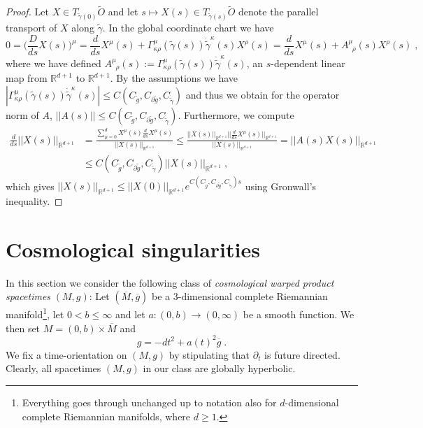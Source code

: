 \documentclass[reqno]{article}
\newcommand{\R}{\mathbb{R}}
\begin{document}
\begin{proof}
Let $X \in T_{\tilde{\gamma}(0)}\tilde{O}$ and let $s \mapsto X(s) \in T_{\tilde{\gamma}(s)} \tilde{O}$ denote the parallel transport of $X$ along $\tilde{\gamma}$. In the global coordinate chart we have $$ 0 = \Big(\frac{D}{ds} X(s)\Big)^\mu = \frac{d}{ds} X^\mu(s) + \Gamma^\mu_{\kappa \rho}(\tilde{\gamma}(s)) \dot{\tilde{\gamma}}^\kappa(s) X^\rho(s) = \frac{d}{ds} X^\mu(s) + A^\mu_{\;\; \rho}(s) X^\rho(s) \;,$$
where we have defined $A^\mu_{\;\; \rho}(s) :=   \Gamma^\mu_{\kappa \rho}(\tilde{\gamma}(s)) \dot{\tilde{\gamma}}^\kappa(s)$, an $s$-dependent linear map from $\R^{d+1}$ to $\R^{d+1}$.
By the assumptions we have $|\Gamma^\mu_{\kappa \rho}(\tilde{\gamma}(s)) \dot{\tilde{\gamma}}^\kappa(s)| \leq C(C_{\tilde{g}}, C_{\partial{\tilde{g}}}, C_{\dot{\tilde{\gamma}}})$ and thus we obtain for the operator norm of $A$, $||A(s)|| \leq  C(C_{\tilde{g}}, C_{\partial{\tilde{g}}}, C_{\dot{\tilde{\gamma}}})$. Furthermore, we compute
\begin{equation*}
\begin{split}
\frac{d}{ds} ||X(s)||_{\R^{d+1}} &= \frac{\sum_{\mu = 0}^d X^\mu(s) \frac{d}{ds} X^\mu(s)}{||X(s)||_{\R^{d+1}}}\leq \frac{||X(s)||_{\R^{d+1}} ||\frac{d}{ds} X^\mu(s)||_{\R^{d+1}}}{||X(s)||_{\R^{d+1}}}  = ||A(s) X(s)||_{\R^{d+1}} \\
&\leq C(C_{\tilde{g}}, C_{\partial{\tilde{g}}}, C_{\dot{\tilde{\gamma}}}) ||X(s)||_{\R^{d+1}} \;,
\end{split}
\end{equation*}
which gives $||X(s)||_{\R^{d+1}} \leq ||X(0)||_{\R^{d+1}} e^{C(C_{\tilde{g}}, C_{\partial{\tilde{g}}}, C_{\dot{\tilde{\gamma}}}) s}$ using Gronwall's inequality.
\end{proof}



\section{Cosmological singularities} \label{SecCos}

In this section we consider the following class of \emph{cosmological warped product spacetimes} $(M,g)$: Let $(\overline{M}, \overline{g})$ be a $3$-dimensional complete Riemannian manifold\footnote{Everything goes through  unchanged up to notation also for $d$-dimensional complete Riemannian manifolds, where $d \geq 1$.}, let $0 < b \leq \infty$ and let $a :(0,b) \to (0, \infty)$ be a smooth function.   We then set $M= (0,b) \times \overline{M}$ and 
\begin{equation}
\label{EqMetricWP} g = -dt^2 + a(t)^2 \overline{g}\;.
\end{equation} 
We fix a time-orientation on $(M,g)$ by stipulating that $\partial_t$ is future directed. Clearly, all spacetimes $(M,g)$ in our class are globally hyperbolic.  
\end{document}
